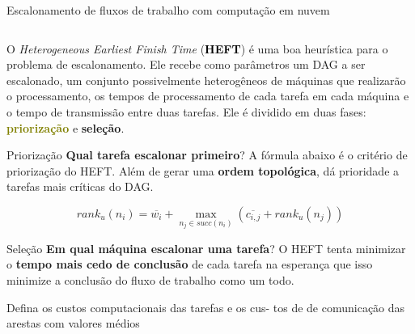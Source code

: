 \documentclass[final]{beamer}
\newcommand{\colorize}[2]{\textbf{\textcolor{#1}{#2}}}
\begin{document}
\begin{frame}[t]
\begin{columns}[t]
\begin{column}{0.60\paperwidth} 
	\begin{block}{Escalonamento de fluxos de trabalho com computação em nuvem}
		\begin{columns}[totalwidth=0.60\paperwidth]
		\begin{column}{0.33\paperwidth}
			O \emph{Heterogeneous Earliest Finish Time} (\colorize{black}{HEFT})
			\cite{topcoglu:heft} é uma boa heurística para o
			problema de escalonamento. Ele recebe como parâmetros um DAG a ser
			escalonado, um conjunto possivelmente heterogêneos de máquinas que
			realizarão o processamento, os tempos de processamento de cada tarefa
			em cada máquina e o tempo de transmissão entre duas tarefas. Ele
			é dividido em duas fases: \colorize{olive}{priorização} e 
			\colorize{n_violet}{seleção}. 


			\begin{block}{Priorização}
			\colorize{n_red}{Qual tarefa escalonar primeiro}? 
			A fórmula abaixo é o critério de priorização do HEFT. Além de gerar
			uma \colorize{n_violet}{ordem topológica}, dá prioridade a tarefas
			mais críticas do DAG.

			
			$$ \label{eq:rank} rank_u(n_i) = \overline{w_i} + \max_{n_j \in succ(n_i)} (\overline{c_{i,j}} + rank_u(n_j)) $$
				
			\end{block}

			\begin{block}{Seleção}
				\colorize{n_red}{Em qual máquina escalonar uma tarefa}? O HEFT
				tenta minimizar o \colorize{n_blue}{tempo mais cedo de conclusão}
				de cada tarefa na esperança que isso minimize a conclusão do
				fluxo de trabalho como um todo.
			\end{block}
		
		

			\begin{shaded}
			\begin{codebox}
			\li	Defina os custos computacionais das tarefas e os cus-
			\zi tos de de comunicação das arestas com valores médios
		

\end{codebox}
\end{shaded}
\end{column}
\end{columns}
\end{block}
\end{column}
\end{columns}
\end{frame}
\end{document}
